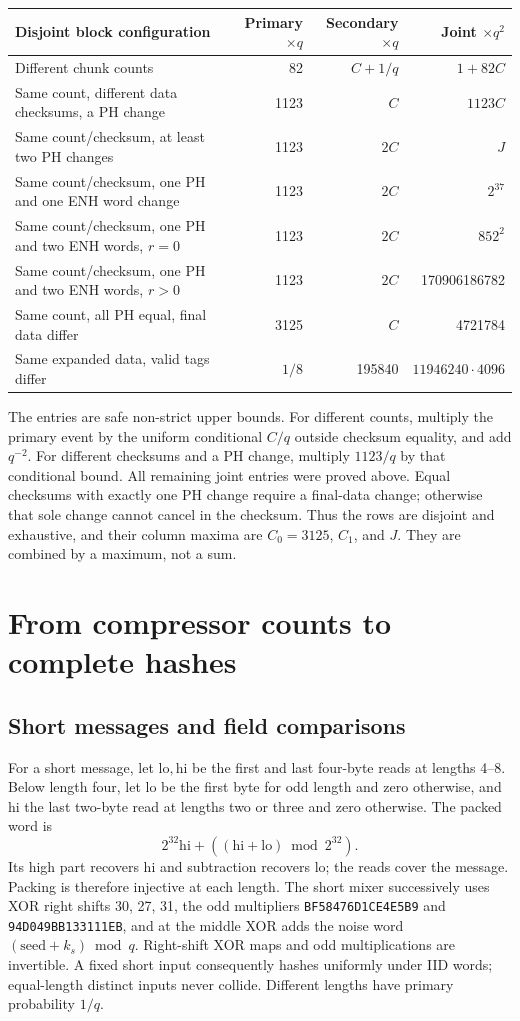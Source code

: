 \begin{center}\small
\begin{tabular}{@{}p{85mm}rrr@{}}\toprule
Disjoint block configuration&Primary $\times q$&Secondary $\times q$&Joint $\times q^2$\\\midrule
Different chunk counts&82&$C+1/q$&$1+82C$\\
Same count, different data checksums, a PH change&1123&$C$&$1123C$\\
Same count/checksum, at least two PH changes&1123&$2C$&$J$\\
Same count/checksum, one PH and one ENH word change&1123&$2C$&$2^{37}$\\
Same count/checksum, one PH and two ENH words, $r=0$&1123&$2C$&$852^2$\\
Same count/checksum, one PH and two ENH words, $r>0$&1123&$2C$&170906186782\\
Same count, all PH equal, final data differ&3125&$C$&4721784\\
Same expanded data, valid tags differ&$1/8$&195840&$11946240\cdot4096$\\\bottomrule
\end{tabular}
\end{center}
The entries are safe non-strict upper bounds. For different counts, multiply the primary event by the uniform conditional $C/q$ outside checksum equality, and add $q^{-2}$. For different checksums and a PH change, multiply $1123/q$ by that conditional bound. All remaining joint entries were proved above. Equal checksums with exactly one PH change require a final-data change; otherwise that sole change cannot cancel in the checksum. Thus the rows are disjoint and exhaustive, and their column maxima are $C_0=3125$, $C_1$, and $J$. They are combined by a maximum, not a sum.

\section{From compressor counts to complete hashes}\label{sec:assembly}
\subsection{Short messages and field comparisons}
For a short message, let $\mathrm{lo},\mathrm{hi}$ be the first and last four-byte reads at lengths 4--8. Below length four, let $\mathrm{lo}$ be the first byte for odd length and zero otherwise, and $\mathrm{hi}$ the last two-byte read at lengths two or three and zero otherwise. The packed word is
\[
 2^{32}\mathrm{hi}+((\mathrm{hi}+\mathrm{lo})\bmod2^{32}).
\]
Its high part recovers $\mathrm{hi}$ and subtraction recovers $\mathrm{lo}$; the reads cover the message. Packing is therefore injective at each length. The short mixer successively uses XOR right shifts 30, 27, 31, the odd multipliers \texttt{BF58476D1CE4E5B9} and \texttt{94D049BB133111EB}, and at the middle XOR adds the noise word $(\mathrm{seed}+k_s)\bmod q$. Right-shift XOR maps and odd multiplications are invertible. A fixed short input consequently hashes uniformly under IID words; equal-length distinct inputs never collide. Different lengths have primary probability $1/q$.

